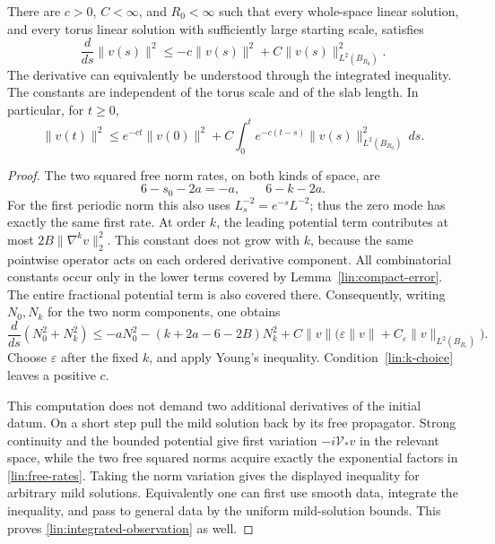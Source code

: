 \begin{proposition}\label{lin:observation}
There are $c>0$, $C<\infty$, and $R_0<\infty$ such that every whole-space
linear solution, and every torus linear solution with sufficiently large
starting scale, satisfies
\begin{equation}\label{lin:energy-observation}
 \frac{d}{ds}\|v(s)\|^2
 \le-c\|v(s)\|^2+C\|v(s)\|_{L^2(B_{R_0})}^2.
\end{equation}
The derivative can equivalently be understood through the integrated
inequality.  The constants are independent of the torus scale and of
the slab length.  In particular, for $t\ge0$,
\begin{equation}\label{lin:integrated-observation}
 \|v(t)\|^2\le e^{-ct}\|v(0)\|^2
   +C\int_0^t e^{-c(t-s)}\|v(s)\|_{L^2(B_{R_0})}^2\,ds.
\end{equation}
\end{proposition}

\begin{proof}
The two squared free norm rates, on both kinds of space, are
\begin{equation}\label{lin:free-rates}
 6-s_0-2a=-a,\qquad 6-k-2a.
\end{equation}
For the first periodic norm this also uses
$L_s^{-2}=e^{-s}L^{-2}$; thus the zero mode has exactly the same first
rate.  At order $k$, the leading potential term contributes at most
$2B\|\nabla^kv\|_2^2$.  This constant does not grow with $k$, because
the same pointwise operator acts on each ordered derivative component.
All combinatorial constants occur only in the lower terms covered by
Lemma~\ref{lin:compact-error}.  The entire fractional potential term is
also covered there.  Consequently, writing $N_0,N_k$ for the two norm
components, one obtains
\[
 \frac{d}{ds}(N_0^2+N_k^2)
 \le-aN_0^2-(k+2a-6-2B)N_k^2
       +C\|v\|\big(\varepsilon\|v\|
                         +C_\varepsilon\|v\|_{L^2(B_{R_\varepsilon})}\big).
\]
Choose $\varepsilon$ after the fixed $k$, and apply Young's inequality.
Condition~\eqref{lin:k-choice} leaves a positive $c$.

This computation does not demand two additional derivatives of the
initial datum.  On a short step pull the mild solution back by its free
propagator.  Strong continuity and the bounded potential give first
variation $-i\mathcal V_*v$ in the relevant space, while the two free
squared norms acquire exactly the exponential factors in
\eqref{lin:free-rates}.  Taking the norm variation gives the displayed
inequality for arbitrary mild solutions.  Equivalently one can first
use smooth data, integrate the inequality, and pass to general data by
the uniform mild-solution bounds.  This proves
\eqref{lin:integrated-observation} as well.
\end{proof}

